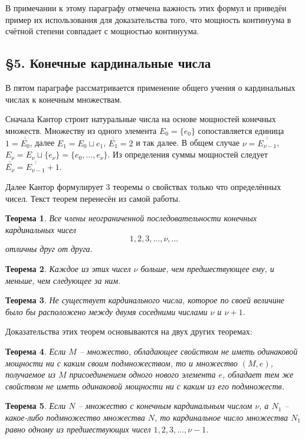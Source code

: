 \documentclass[a4paper,12pt]{extarticle}
\newtheorem{theorem}{Теорема}[subsection]
\theoremstyle{definition}
\newcommand{\car}[1]{\overline{\overline{#1}}}
\begin{document}
В примечании к этому параграфу отмечена важность этих формул и приведён пример их использования для доказательства того,
что мощность континуума в счётной степени совпадает с мощностью континуума.

\subsection{\S 5. Конечные кардинальные числа}
В пятом параграфе рассматривается применение общего учения о кардинальных числах к конечным множествам.

Сначала Кантор строит натуральные числа на основе мощностей конечных множеств.
Множеству из одного элемента $E_0 = \{e_0\}$ сопоставляется единица $1 = \car{E_0}$, далее $E_1 = E_0 \sqcup {e_1}$, $\car{E_1} = 2$ и так далее.
В общем случае $\nu = \car{E_{\nu - 1}}$, $E_{\nu} = E_{\nu} \sqcup \{e_{\nu}\} = \{e_0, ..., e_{\nu}\}$.
Из определения суммы мощностей следует $\car{E_{\nu}} = \car{E_{\nu-1}} + 1$.

Далее Кантор формулирует 3 теоремы о свойствах только что определённых чисел.
Текст теорем перенесён из самой работы.
\begin{theorem}
\label{A}
Все члены неограниченной последовательности конечных кардинальных чисел $$1, 2, 3, ..., \nu,...$$ отличны друг от друга.
\end{theorem}
\begin{theorem}
\label{B}
Каждое из этих чисел $\nu$ больше, чем предшествующее ему, и меньше, чем следующее за ним.
\end{theorem}
\begin{theorem}
\label{C}
Не существует кардинального числа, которое по своей величине было бы расположено между двумя соседними числами $\nu$ и $\nu + 1$.
\end{theorem}
Доказательства этих теорем основываются на двух других теоремах:
\begin{theorem}
\label{D}
Если $M$ -- множество, обладающее свойством не иметь одинаковой мощности ни с каким своим подмножеством, то и множество $(M, e)$,
получаемое из $M$ присоединением  одного нового элемента $e$, обладает тем же свойством не иметь одинаковой мощности ни с каким из его подмножеств.
\end{theorem}
\begin{theorem}
\label{E}
Если $N$ -- множество с конечным кардинальным числом $\nu$, а $N_1$ -- какое-либо подмножество множества $N$, то кардинальное число множества $N_1$ равно одному из предшествующих чисел $1, 2, 3, ..., \nu - 1$.
\end{theorem}
\end{document}
